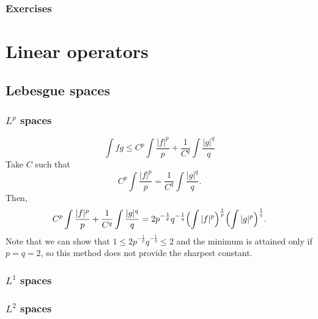 \documentclass{../../large}
\begin{document}
\section*{Exercises}










\part{Linear operators}



\chapter{Lebesgue spaces}
\section{$L^p$ spaces}

\begin{prb}
\end{prb}
\begin{pf}
\[\int fg\le C^p\int\frac{|f|^p}p+\frac1{C^q}\int\frac{|g|^q}q\]
Take $C$ such that
\[C^p\int\frac{|f|^p}p=\frac1{C^q}\int\frac{|g|^q}q.\]
Then,
\[C^p\int\frac{|f|^p}p+\frac1{C^q}\int\frac{|g|^q}q=2p^{-\frac1p}q^{-\frac1q}\Bigl(\int|f|^p\Bigr)^{\frac1p}\Bigl(\int|g|^p\Bigr)^{\frac1q}.\]
Note that we can show that $1\le2p^{-\frac1p}q^{-\frac1q}\le2$ and the minimum is attained only if $p=q=2$, so this method does not provide the sharpest constant.
\end{pf}


\section{$L^1$ spaces}

\begin{prb}[Convolution?]
\end{prb}
\begin{prb}
\end{prb}
\begin{prb}
\end{prb}

\section{$L^2$ spaces}
\end{document}
